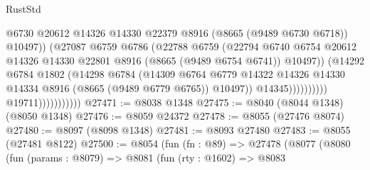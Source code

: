 \begin{lexlean}{RustStd}
\begin{coremodule}
                                              @6730
                                              @20612
                                              @14326
                                              @14330
                                              @22379
                                              @8916
                                              (@8665 (@9489 @6730 @6718))
                                              @10497))
                                          (@27087
                                            @6759
                                            @6786
                                            (@22788
                                              @6759
                                              (@22794
                                                @6740
                                                @6754
                                                @20612
                                                @14326
                                                @14330
                                                @22801
                                                @8916
                                                (@8665 (@9489 @6754 @6741))
                                                @10497))
                                            (@14292
                                              @6784
                                              @1802
                                              (@14298
                                                @6784
                                                (@14309
                                                  @6764
                                                  @6779
                                                  @14322
                                                  @14326
                                                  @14330
                                                  @14334
                                                  @8916
                                                  (@8665 (@9489 @6779 @6765))
                                                  @10497))
                                              @14345))))))))))
                          @19711)))))))))))
@27471 := @8038 @1348
@27475 := @8040 (@8044 @1348) (@8050 @1348)
@27476 := @8059 @24372
@27478 := @8055 (@27476 @8074)
@27480 := @8097 (@8098 @1348)
@27481 := @8093 @27480
@27483 := @8055 (@27481 @8122)
@27500 := @8054
    (fun (fn : @89) =>
    @27478
      (@8077
        (@8080
          (fun (params : @8079) =>
          @8081
            (fun (rty : @1602) =>
            @8083

\end{coremodule}
\end{lexlean}
